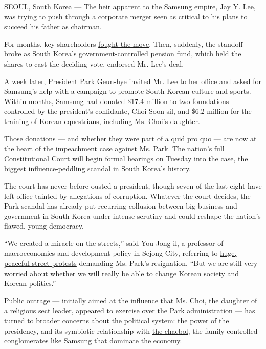 SEOUL, South Korea --- The heir apparent to the Samsung empire, Jay Y.
Lee, was trying to push through a corporate merger seen as critical to
his plans to succeed his father as chairman.

For months, key shareholders
\href{https://www.nytimes3xbfgragh.onion/2015/07/05/business/samsung-merger-plan-called-unfair-to-some-investors.html?_r=0}{fought
the move}. Then, suddenly, the standoff broke as South Korea's
government-controlled pension fund, which held the shares to cast the
deciding vote, endorsed Mr. Lee's deal.

A week later, President Park Geun-hye invited Mr. Lee to her office and
asked for Samsung's help with a campaign to promote South Korean culture
and sports. Within months, Samsung had donated \$17.4 million to two
foundations controlled by the president's confidante, Choi Soon-sil, and
\$6.2 million for the training of Korean equestrians, including
\href{http://www.nytimes3xbfgragh.onion/2017/01/02/world/asia/south-korea-scandal-choi-soon-sil-daughter.html}{Ms.
Choi's daughter}.

Those donations --- and whether they were part of a quid pro quo --- are
now at the heart of the impeachment case against Ms. Park. The nation's
full Constitutional Court will begin formal hearings on Tuesday into the
case, \href{http://nyti.ms/2dQpNWq}{the biggest influence-peddling
scandal} in South Korea's history.

The court has never before ousted a president, though seven of the last
eight have left office tainted by allegations of corruption. Whatever
the court decides, the Park scandal has already put recurring collusion
between big business and government in South Korea under intense
scrutiny and could reshape the nation's flawed, young democracy.

``We created a miracle on the streets,'' said You Jong-il, a professor
of macroeconomics and development policy in Sejong City, referring to
\href{http://www.nytimes3xbfgragh.onion/2016/11/13/world/asia/korea-park-geun-hye-protests.html}{huge,
peaceful street protests} demanding Ms. Park's resignation. ``But we are
still very worried about whether we will really be able to change Korean
society and Korean politics.''

Public outrage --- initially aimed at the influence that Ms. Choi, the
daughter of a religious sect leader, appeared to exercise over the Park
administration --- has turned to broader concerns about the political
system: the power of the presidency, and its symbiotic relationship with
\href{http://www.nytimes3xbfgragh.onion/2011/09/14/business/global/south-korean-chaebol-under-increasing-pressure.html}{the
chaebol}, the family-controlled conglomerates like Samsung that dominate
the economy.


